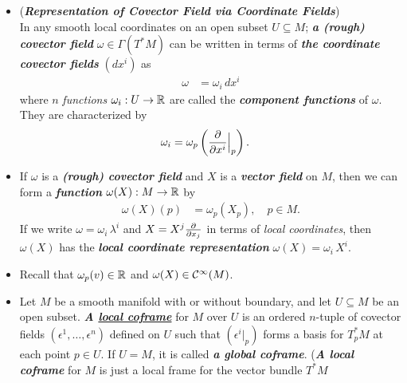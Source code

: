 \documentclass[11pt]{article}
\begin{document}
\begin{itemize}
\item \begin{remark}  (\emph{\textbf{Representation of Covector Field via Coordinate Fields}})\\
In any smooth local coordinates on an open subset $U \subseteq M$; \emph{\textbf{a (rough) covector field}} $\omega \in \Gamma(T^{*}M)$ can be written in terms of \emph{\textbf{the coordinate covector fields}} $(dx^i)$ as
\begin{align*}
\omega &= \omega_{i}\, dx^{i}
\end{align*} where $n$ \emph{functions} $\omega_i: U \rightarrow {\mathbb R}$ are called the \emph{\textbf{component functions}} of $\omega$. They are characterized by
\begin{align*}
\omega_{i} &= \omega_{p}\left(\frac{\partial }{ \partial x^{i}}\Bigr|_{p}\right).
\end{align*}
\end{remark}

\item \begin{remark}
 If $\omega$ is a \emph{\textbf{(rough) covector field}} and $X$ is a \emph{\textbf{vector field}} on $M$, then we can form a
\textbf{\emph{function}} $\omega(X): M \rightarrow {\mathbb R}$ by
\begin{align*}
\omega(X)(p) &= \omega_{p}(X_{p}), \quad p \in M.
\end{align*} If we write $\omega = \omega_i\,\lambda^i$ and $X = X^j \frac{\partial }{ \partial x_{j}}$ in terms of \emph{local coordinates}, then $\omega(X)$ has the \emph{\textbf{local coordinate representation}} $\omega(X) = \omega_i\, X^i$.
\end{remark}

\item \begin{remark}
Recall that $\omega_p(v) \in {\mathbb R}$ and $\omega(X) \in {\mathcal C}^{\infty}(M)$.
\end{remark}

\item \begin{definition}
Let $M$ be a smooth manifold with or without boundary, and let $U \subseteq M$ be an open subset. \emph{\textbf{A \underline{local coframe}}} for $M$ over $U$ is an ordered $n$-tuple of covector fields $(\epsilon^1, \ldots, \epsilon^n)$ defined on $U$ such that $(\epsilon^{i}|_{p})$ forms a basis for $T_{p}^{*}M$ at each point $p \in U$. If $U = M$, it is called \emph{\textbf{a global coframe}}. (\emph{\textbf{A local coframe}} for $M$ is just a local frame for the vector bundle $T^{*}M$
\end{definition}


\end{itemize}
\end{document}
